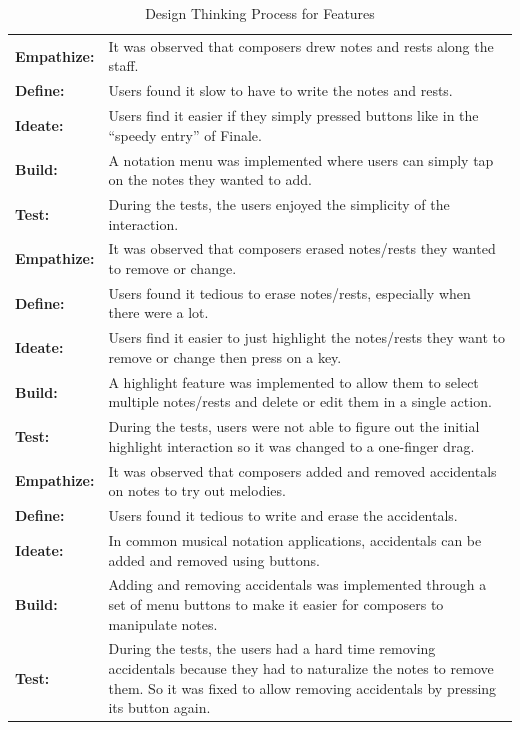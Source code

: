 		\begin{longtable}{|p{2.5cm} p{12.5cm}|}
			\caption{Design Thinking Process for Features} \label{tab:design-thinking} \\ 
		  	\hline

		  	\textbf{Empathize:} 	& It was observed that composers drew notes and rests along the staff. \\
		  	\textbf{Define:} 		& Users found it slow to have to write the notes and rests. \\
		  	\textbf{Ideate:} 		& Users find it easier if they simply pressed buttons like in the ``speedy entry'' of Finale. \\
		  	\textbf{Build:} 			& A notation menu was implemented where users can simply tap on the notes they wanted to add. \\
		  	\textbf{Test:} 			& During the tests, the users enjoyed the simplicity of the interaction. \\
		  	\hline

		  	\textbf{Empathize:} 	& It was observed that composers erased notes/rests they wanted to remove or change. \\
		  	\textbf{Define:} 		& Users found it tedious to erase notes/rests, especially when there were a lot. \\
		  	\textbf{Ideate:} 		& Users find it easier to just highlight the notes/rests they want to remove or change then press on a key. \\
		  	\textbf{Build:} 			& A highlight feature was implemented to allow them to select multiple notes/rests and delete or edit them in a single action.  \\
		  	\textbf{Test:} 			& During the tests, users were not able to figure out the initial highlight interaction so it was changed to a one-finger drag. \\
		  	\hline

		  	\textbf{Empathize:} 	& It was observed that composers added and removed accidentals on notes to try out melodies. \\
		  	\textbf{Define:} 		& Users found it tedious to write and erase the accidentals. \\
		  	\textbf{Ideate:} 		& In common musical notation applications, accidentals can be added and removed using buttons. \\
		  	\textbf{Build:} 			& Adding and removing accidentals was implemented through a set of menu buttons to make it easier for composers to manipulate notes. \\
		  	\textbf{Test:} 			& During the tests, the users had a hard time removing accidentals because they had to naturalize the notes to remove them. So it was fixed to allow removing accidentals by pressing its button again. \\
		  	\hline
		  	

\end{longtable}
